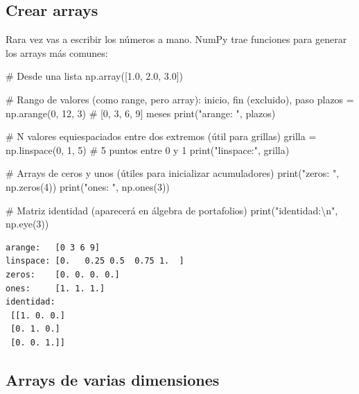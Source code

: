 \documentclass[
  spanish,
  letterpaper,
  DIV=11,
  numbers=noendperiod]{scrreprt}
\newenvironment{Shaded}{\begin{snugshade}}{\end{snugshade}}
\newcommand{\BuiltInTok}[1]{\textcolor[rgb]{0.00,0.23,0.31}{#1}}
\newcommand{\CharTok}[1]{\textcolor[rgb]{0.13,0.47,0.30}{#1}}
\newcommand{\CommentTok}[1]{\textcolor[rgb]{0.37,0.37,0.37}{#1}}
\newcommand{\DecValTok}[1]{\textcolor[rgb]{0.68,0.00,0.00}{#1}}
\newcommand{\FloatTok}[1]{\textcolor[rgb]{0.68,0.00,0.00}{#1}}
\newcommand{\NormalTok}[1]{\textcolor[rgb]{0.00,0.23,0.31}{#1}}
\newcommand{\OperatorTok}[1]{\textcolor[rgb]{0.37,0.37,0.37}{#1}}
\newcommand{\StringTok}[1]{\textcolor[rgb]{0.13,0.47,0.30}{#1}}
\begin{document}
\subsection{Crear arrays}\label{crear-arrays}

Rara vez vas a escribir los números a mano. NumPy trae funciones para
generar los arrays más comunes:

\label{creacion}
\begin{Shaded}
\begin{Highlighting}[]
\CommentTok{\# Desde una lista}
\NormalTok{np.array([}\FloatTok{1.0}\NormalTok{, }\FloatTok{2.0}\NormalTok{, }\FloatTok{3.0}\NormalTok{])}

\CommentTok{\# Rango de valores (como range, pero array): inicio, fin (excluido), paso}
\NormalTok{plazos }\OperatorTok{=}\NormalTok{ np.arange(}\DecValTok{0}\NormalTok{, }\DecValTok{12}\NormalTok{, }\DecValTok{3}\NormalTok{)          }\CommentTok{\# [0, 3, 6, 9] meses}
\BuiltInTok{print}\NormalTok{(}\StringTok{"arange:  "}\NormalTok{, plazos)}

\CommentTok{\# N valores equiespaciados entre dos extremos (útil para grillas)}
\NormalTok{grilla }\OperatorTok{=}\NormalTok{ np.linspace(}\DecValTok{0}\NormalTok{, }\DecValTok{1}\NormalTok{, }\DecValTok{5}\NormalTok{)         }\CommentTok{\# 5 puntos entre 0 y 1}
\BuiltInTok{print}\NormalTok{(}\StringTok{"linspace:"}\NormalTok{, grilla)}

\CommentTok{\# Arrays de ceros y unos (útiles para inicializar acumuladores)}
\BuiltInTok{print}\NormalTok{(}\StringTok{"zeros:   "}\NormalTok{, np.zeros(}\DecValTok{4}\NormalTok{))}
\BuiltInTok{print}\NormalTok{(}\StringTok{"ones:    "}\NormalTok{, np.ones(}\DecValTok{3}\NormalTok{))}

\CommentTok{\# Matriz identidad (aparecerá en álgebra de portafolios)}
\BuiltInTok{print}\NormalTok{(}\StringTok{"identidad:}\CharTok{\textbackslash{}n}\StringTok{"}\NormalTok{, np.eye(}\DecValTok{3}\NormalTok{))}
\end{Highlighting}
\end{Shaded}

\begin{verbatim}
arange:   [0 3 6 9]
linspace: [0.   0.25 0.5  0.75 1.  ]
zeros:    [0. 0. 0. 0.]
ones:     [1. 1. 1.]
identidad:
 [[1. 0. 0.]
 [0. 1. 0.]
 [0. 0. 1.]]
\end{verbatim}

\subsection{Arrays de varias
dimensiones}\label{arrays-de-varias-dimensiones}
\end{document}
